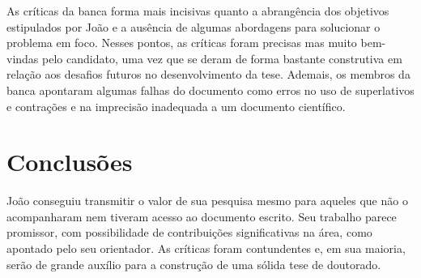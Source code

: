 \documentclass[a4paper]{report}
\begin{document}
As críticas da banca forma mais incisivas quanto a abrangência dos objetivos estipulados por João e a ausência de algumas abordagens para solucionar o problema em foco.
Nesses pontos, as críticas foram precisas mas muito bem-vindas pelo candidato, uma vez que se deram de forma bastante construtiva em relação aos desafios futuros no desenvolvimento da tese.
Ademais, os membros da banca apontaram algumas falhas do documento como erros no uso de superlativos e contrações e na imprecisão inadequada a um documento científico.

\section{Conclusões}

João conseguiu transmitir o valor de sua pesquisa mesmo para aqueles que não o acompanharam nem tiveram acesso ao documento escrito.
Seu trabalho parece promissor, com possibilidade de contribuições significativas na área, como apontado pelo seu orientador.
As críticas foram contundentes e, em sua maioria, serão de grande auxílio para a construção de uma sólida tese de doutorado.
\end{document}
